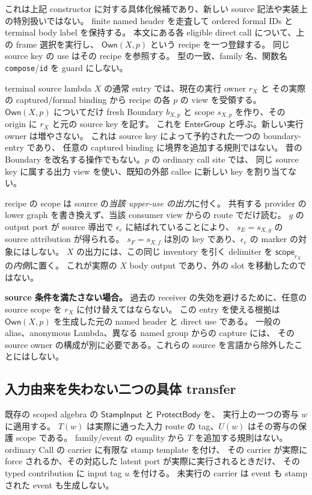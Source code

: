\documentclass[11pt,a4paper]{article}
\newcommand{\Scope}{\mathsf{scope}}
\begin{document}
これは上記 constructor に対する具体化候補であり、新しい source 記法や実装上の特別扱いではない。
finite named header を走査して ordered formal IDs と terminal body label を保持する。
本文にある各 eligible direct call について、上の frame 選択を実行し、
\(\mathsf{Own}(X,p)\) という recipe を一つ登録する。
同じ source key の use はその recipe を参照する。
型の一致、family 名、関数名 \texttt{compose}/\texttt{id} を guard にしない。

terminal source lambda \(X\) の通常 entry では、現在の実行 owner \(r_X\) と
その実際の captured/formal binding から recipe の各 \(p\) の view を受領する。
\(\mathsf{Own}(X,p)\) についてだけ fresh Boundary \(b_{X,p}\) と
scope \(s_{X,p}\) を作り、その origin に \(r_X\) と元の source key を記す。
これを \(\mathsf{EnterGroup}\) と呼ぶ。新しい実行 owner は増やさない。
これは source key によって予約された一つの boundary-entry であり、
任意の captured binding に境界を追加する規則ではない。
昔の Boundary を改名する操作でもない。\(p\) の ordinary call site では、
同じ source key に属する出力 view を使い、既知の外部 callee に新しい key を割り当てない。

recipe の scope は source の\emph{当該 upper-use の出力}に付く。
共有する provider の lower graph を書き換えず、当該 consumer view からの route でだけ読む。
\(g\) の output port が source 導出で \(\epsilon_e\) に結ばれていることにより、
\(s_E=s_{X,g}\) の source attribution が得られる。
\(s_F=s_{X,f}\) は別の key であり、\(\epsilon_e\) の marker の対象にはしない。
\(X\) の出力には、この同じ inventory を引く delimiter を \(\Scope_{r_X}\) の\emph{内側}に置く。
これが実際の \(X\) body output であり、外の slot を移動したのではない。

\textbf{source 条件を満たさない場合。}
過去の receiver の失効を避けるために、任意の source scope を \(r_X\) に付け替えてはならない。
この entry を使える根拠は \(\mathsf{Own}(X,p)\) を生成した元の named header と direct use である。
一般の alias、anonymous Lambda、異なる named group からの capture には、
その source owner の構成が別に必要である。これらの source を言語から除外したことにはしない。

\subsection{入力由来を失わない二つの具体 transfer}

既存の scoped algebra の \(\mathsf{StampInput}\) と \(\mathsf{ProtectBody}\) を、
実行上の一つの寄与 \(w\) に適用する。
\(T(w)\) は実際に通った入力 route の tag、\(U(w)\) はその寄与の保護 scope である。
family/event の equality から \(T\) を追加する規則はない。
ordinary Call の carrier に有限な stamp template を付け、
その carrier が実際に force されるか、その対応した latent port が実際に実行されるときだけ、
その typed contribution に input tag \(u\) を付ける。
未実行の carrier は event も stamp された event も生成しない。
\end{document}
